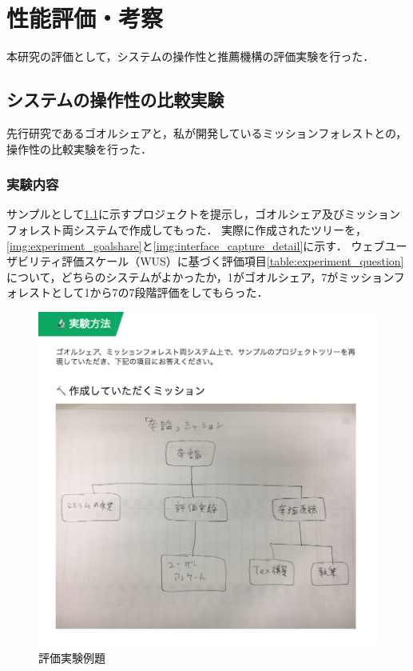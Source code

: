 \chapter{性能評価・考察}
本研究の評価として，システムの操作性と推薦機構の評価実験を行った．

\section{システムの操作性の比較実験}
先行研究であるゴオルシェアと，私が開発しているミッションフォレストとの，操作性の比較実験を行った．

\subsection{実験内容}
サンプルとして\ref{img:experiment_question}に示すプロジェクトを提示し，ゴオルシェア及びミッションフォレスト両システムで作成してもった．
実際に作成されたツリーを，\ref{img:experiment_goalshare}と\ref{img:interface_capture_detail}に示す．
ウェブユーザビリティ評価スケール（WUS）に基づく評価項目\ref{table:experiment_question}について，どちらのシステムがよかったか，1がゴオルシェア，7がミッションフォレストとして1から7の7段階評価をしてもらった．

\begin{figure}[t]
	\begin{center}
		\includegraphics[width=0.9\linewidth]{assets/img/experiment_question.png}
		\caption{評価実験例題}
		\label{img:experiment_question}
	\end{center}
\end{figure}

